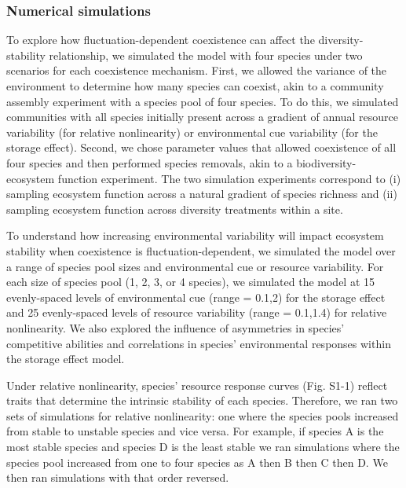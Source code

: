 \documentclass[12pt,]{article}
\begin{document}
\subsubsection{Numerical simulations}\label{numerical-simulations}

To explore how fluctuation-dependent coexistence can affect the
diversity-stability relationship, we simulated the model with four
species under two scenarios for each coexistence mechanism. First, we
allowed the variance of the environment to determine how many species
can coexist, akin to a community assembly experiment with a species pool
of four species. To do this, we simulated communities with all species
initially present across a gradient of annual resource variability (for
relative nonlinearity) or environmental cue variability (for the storage
effect). Second, we chose parameter values that allowed coexistence of
all four species and then performed species removals, akin to a
biodiversity-ecosystem function experiment. The two simulation
experiments correspond to (i) sampling ecosystem function across a
natural gradient of species richness and (ii) sampling ecosystem
function across diversity treatments within a site.

To understand how increasing environmental variability will impact
ecosystem stability when coexistence is fluctuation-dependent, we
simulated the model over a range of species pool sizes and environmental
cue or resource variability. For each size of species pool (1, 2, 3, or
4 species), we simulated the model at 15 evenly-spaced levels of
environmental cue (range = 0.1,2) for the storage effect and 25
evenly-spaced levels of resource variability (range = 0.1,1.4) for
relative nonlinearity. We also explored the influence of asymmetries in
species' competitive abilities and correlations in species'
environmental responses within the storage effect model.

Under relative nonlinearity, species' resource response curves (Fig.
S1-1) reflect traits that determine the intrinsic stability of each
species. Therefore, we ran two sets of simulations for relative
nonlinearity: one where the species pools increased from stable to
unstable species and vice versa. For example, if species A is the most
stable species and species D is the least stable we ran simulations
where the species pool increased from one to four species as A then B
then C then D. We then ran simulations with that order reversed.
\end{document}
